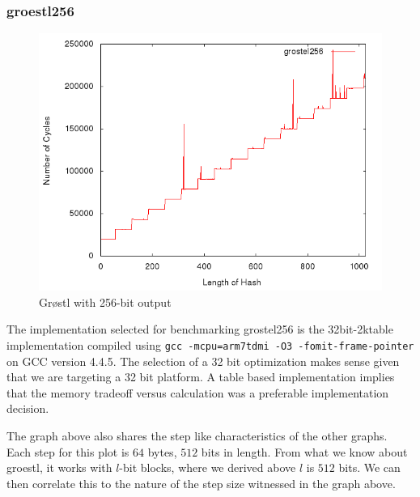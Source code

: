 \documentclass[10pt,a4paper]{article}
\begin{document}
\subsubsection{groestl256}
    \begin{figure}[H]
        \begin{center}
            \includegraphics[scale=0.5]{images/grostel256.png} 
            \caption{Gr{\o}stl with 256-bit output}
        \end{center}
    \end{figure}

The implementation selected for benchmarking grostel256 is the 32bit-2ktable
implementation compiled using \texttt{gcc -mcpu=arm7tdmi -O3
-fomit-frame-pointer} on GCC version 4.4.5. The selection of a 32 bit
optimization makes sense given that we are targeting a 32 bit platform. A table
based implementation implies that the memory tradeoff versus calculation was a
preferable implementation decision.

The graph above also shares the step like characteristics of the other graphs.
Each step for this plot is $64$ bytes, $512$ bits in length. From what we know
about groestl, it works with $l$-bit blocks, where we derived above $l$ is $512$
bits. We can then correlate this to the nature of the step size witnessed in the
graph above.
\end{document}
